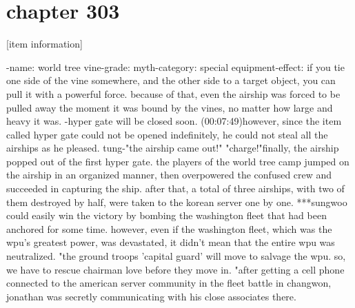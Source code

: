 \section{chapter 303}

[item information]




-name: world tree vine-grade: myth-category: special equipment-effect: if you tie one side of the vine somewhere, and the other side to a target object, you can pull it with a powerful force.
because of that, even the airship was forced to be pulled away the moment it was bound by the vines, no matter how large and heavy it was.
 -hyper gate will be closed soon.
 (00:07:49)however, since the item called hyper gate could not be opened indefinitely, he could not steal all the airships as he pleased.
tung-"the airship came out!" "charge!"finally, the airship popped out of the first hyper gate.
 the players of the world tree camp jumped on the airship in an organized manner, then overpowered the confused crew and succeeded in capturing the ship.
after that, a total of three airships, with two of them destroyed by half, were taken to the korean server one by one.
 ***sungwoo could easily win the victory by bombing the washington fleet that had been anchored for some time.
 however, even if the washington fleet, which was the wpu's greatest power, was devastated, it didn't mean that the entire wpu was neutralized.
"the ground troops 'capital guard' will move to salvage the wpu.
 so, we have to rescue chairman love before they move in.
"after getting a cell phone connected to the american server community in the fleet battle in changwon, jonathan was secretly communicating with his close associates there.

